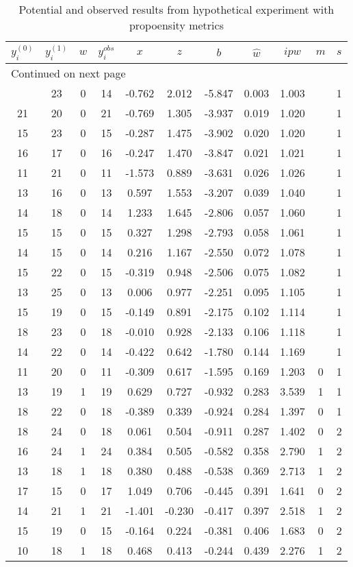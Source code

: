 \newpage
\begin{longtable}{c c c c c c c c c c c }
\caption{Potential and observed results from hypothetical experiment with propoensity metrics \label{tab:propensity}} \\
$y_i^{\left(0\right)}$ & $y_i^{\left(1\right)}$ & $w$ & $y_i^{obs}$ & $x$ & $z$ & $b$ & $\hat{w}$ & $ipw$ & $m$ & $s$ \\
\hline
\endhead
\hline \multicolumn{7}{l}{{Continued on next page}} \\ \hline
\endfoot
\endlastfoot
14&23&0&14&-0.762&2.012&-5.847&0.003&1.003&&1\\
21&20&0&21&-0.769&1.305&-3.937&0.019&1.020&&1\\
15&23&0&15&-0.287&1.475&-3.902&0.020&1.020&&1\\
16&17&0&16&-0.247&1.470&-3.847&0.021&1.021&&1\\
11&21&0&11&-1.573&0.889&-3.631&0.026&1.026&&1\\
13&16&0&13&0.597&1.553&-3.207&0.039&1.040&&1\\
14&18&0&14&1.233&1.645&-2.806&0.057&1.060&&1\\
15&15&0&15&0.327&1.298&-2.793&0.058&1.061&&1\\
14&15&0&14&0.216&1.167&-2.550&0.072&1.078&&1\\
15&22&0&15&-0.319&0.948&-2.506&0.075&1.082&&1\\
13&25&0&13&0.006&0.977&-2.251&0.095&1.105&&1\\
15&19&0&15&-0.149&0.891&-2.175&0.102&1.114&&1\\
18&23&0&18&-0.010&0.928&-2.133&0.106&1.118&&1\\
14&22&0&14&-0.422&0.642&-1.780&0.144&1.169&&1\\
11&20&0&11&-0.309&0.617&-1.595&0.169&1.203&0&1\\
13&19&1&19&0.629&0.727&-0.932&0.283&3.539&1&1\\
18&22&0&18&-0.389&0.339&-0.924&0.284&1.397&0&1\\
18&24&0&18&0.061&0.504&-0.911&0.287&1.402&0&2\\
16&24&1&24&0.384&0.505&-0.582&0.358&2.790&1&2\\
13&18&1&18&0.380&0.488&-0.538&0.369&2.713&1&2\\
17&15&0&17&1.049&0.706&-0.445&0.391&1.641&0&2\\
14&21&1&21&-1.401&-0.230&-0.417&0.397&2.518&1&2\\
15&19&0&15&-0.164&0.224&-0.381&0.406&1.683&0&2\\
10&18&1&18&0.468&0.413&-0.244&0.439&2.276&1&2\\

\end{longtable}
